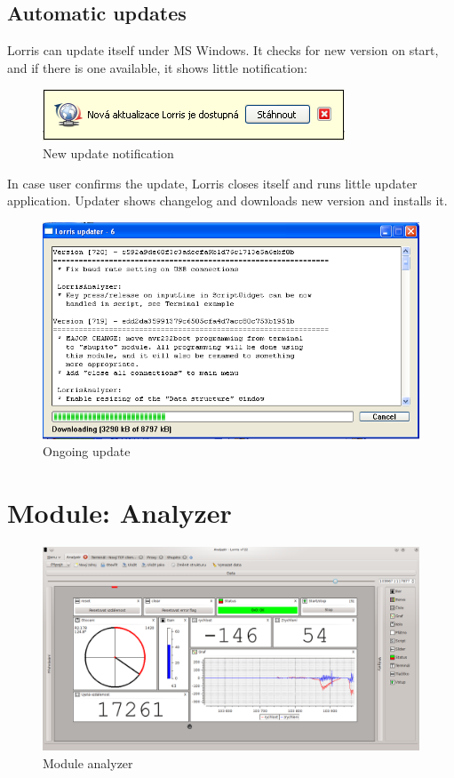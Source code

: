 \documentclass[12pt, a4paper, oneside]{article}
\begin{document}
\subsection{Automatic updates}
Lorris can update itself under MS Windows. It checks for new version on start, and if there is one available, it shows little notification:
\begin{figure}[H]
\begin{center}
\includegraphics[scale=1]{img/update_notify.png}
\caption{New update notification}
\end{center}
\end{figure}
In case user confirms the update, Lorris closes itself and runs little updater application. Updater shows changelog and downloads new version and installs it.
\begin{figure}[H]
\begin{center}
\includegraphics[width=\textwidth]{img/updater.png}
\caption{Ongoing update}
\end{center}
\end{figure}

\newpage
\section{Module: Analyzer}

\begin{figure}[h]
\begin{center}
\includegraphics[width=\textwidth]{img/analyzer_all.png}
\caption{Module analyzer}
\label{Analyzer}
\end{center}
\end{figure}
\end{document}
